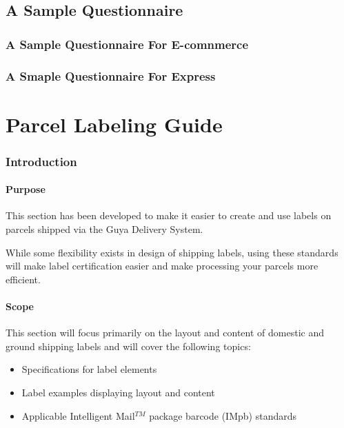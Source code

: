 \begin{appendices}
\section{A Sample Questionnaire}
\subsection{A Sample Questionnaire For E-comnmerce}

\subsection{A Smaple Questionnaire For Express}


  
\chapter{Parcel Labeling Guide}
\subsection{Introduction}
\subsubsection{Purpose}
This section has been developed to make it easier to create and use labels on parcels shipped via the Guya Delivery System.

While some flexibility exists in design of shipping labels, using these standards will make label certification easier and make processing your parcels more efficient.

\subsubsection{Scope}
This section will focus primarily on the layout and content of domestic and ground shipping labels and will cover the following topics: 
\begin{itemize}
	\item Specifications for label elements
	\item Label examples displaying layout and content
	\item Applicable Intelligent Mail$^{TM}$ package barcode (IMpb) standards
\end{itemize}


\end{appendices}
